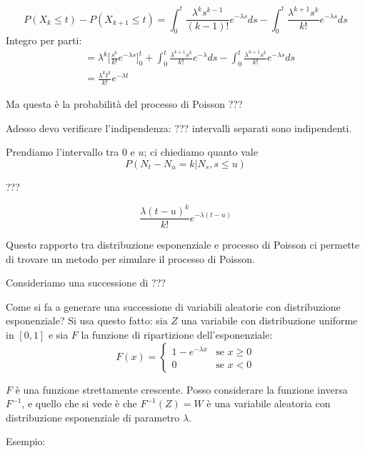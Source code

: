 \documentclass[a4paper,12pt]{book}
\begin{document}
$$ P(X_k \le t) - P (X_{k+1} \le t) = \int_{0}^{t} \frac{\lambda^k s^{k-1}}{(k-1)!} e^{-\lambda s} ds - \int_{0}^{t} \frac{\lambda^{k+1} s^{k}}{k!} e^{- \lambda s} ds $$
Integro per parti:
\begin{align*}
	& = \lambda^k \bigg[\frac{s^k}{k!} e^{-\lambda s}\bigg]_0^{t} + \int_{0}^{t} \frac{\lambda^{k+1} s^{k}}{k!} e^{- \lambda} ds - \int_{0}^{t} \frac{\lambda^{k+1} s^{k}}{k!} e^{- \lambda s} ds \\
	& = \frac{\lambda^k t^k}{k!} e^{-\lambda t}
\end{align*}

Ma questa è la probabilità del processo di Poisson ??? %

Adesso devo verificare l'indipendenza: ??? %
intervalli separati sono indipendenti.

\begin{center}
\end{center}

Prendiamo l'intervallo tra 0 e $ u $; ci chiediamo quanto vale
$$ P(N_t - N_u = k | N_s, s \le u) $$

??? %

$$ \frac{\lambda(t-u)^k}{k!} e^{-\lambda(t-u)} $$

Questo rapporto tra distribuzione esponenziale e processo di Poisson ci permette di trovare un metodo per simulare il processo di Poisson.

Consideriamo una successione di ??? %

Come si fa a generare una successione di variabili aleatorie con distribuzione esponenziale? Si usa questo fatto: sia $ Z $ una variabile con distribuzione uniforme in $ [0,1] $ e sia $ F $ la funzione di ripartizione dell'esponenziale:
$$ F(x) = \begin{cases}
	1 - e^{-\lambda x} & \text{se } x \ge 0 \\
	0 & \text{se } x < 0
\end{cases} $$

$ F $ è una funzione strettamente crescente. Posso considerare la funzione inversa $ F^{-1} $, e quello che si vede è che $ F^{-1}(Z) = W $ è una variabile aleatoria con distribuzione esponenziale di parametro $\lambda$. 

Esempio:
\end{document}
